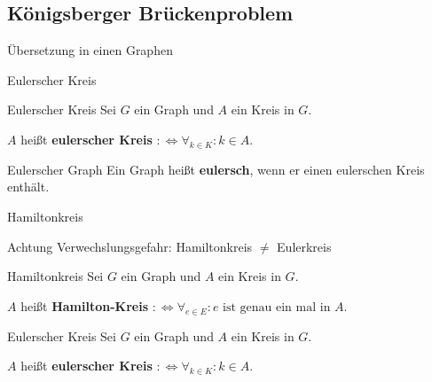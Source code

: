 \subsection{Königsberger Brückenproblem}




\begin{frame}{Übersetzung in einen Graphen}
\begin{center}
\end{center}
\end{frame}

\begin{frame}{Eulerscher Kreis}
\begin{block}{Eulerscher Kreis}
Sei $G$ ein Graph und $A$ ein Kreis in $G$.

$A$ heißt \textbf{eulerscher Kreis} $:\Leftrightarrow \forall_{k \in K}: k \in A$.
\end{block}

\begin{block}{Eulerscher Graph}
Ein Graph heißt \textbf{eulersch}, wenn er einen eulerschen Kreis enthält.
\end{block}
\end{frame}

\begin{frame}{Hamiltonkreis}
\begin{alertblock}{Achtung}
Verwechslungsgefahr: Hamiltonkreis $\neq$ Eulerkreis
\end{alertblock}
\pause
\begin{block}{Hamiltonkreis}
Sei $G$ ein Graph und $A$ ein Kreis in $G$.

$A$ heißt \textbf{Hamilton-Kreis} $:\Leftrightarrow \forall_{e \in E}: e \text{ ist genau ein mal in } A$.
\end{block}

\begin{block}{Eulerscher Kreis}
Sei $G$ ein Graph und $A$ ein Kreis in $G$.

$A$ heißt \textbf{eulerscher Kreis} $:\Leftrightarrow \forall_{k \in K}: k \in A$.
\end{block}
\end{frame}

